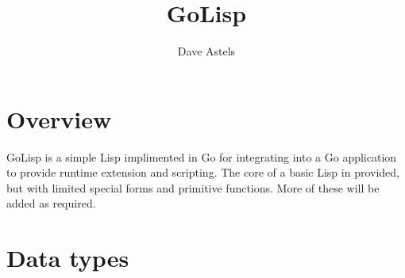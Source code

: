 \documentclass[12pt]{article}
\title{GoLisp}
\author{Dave Astels}
\begin{document}
\maketitle

\section{Overview}

GoLisp is a simple Lisp implimented in Go for integrating into a Go
application to provide runtime extension and scripting. The core of a basic Lisp in provided, but with limited
special forms and primitive functions. More of these will be added as required.

\section{Data types}
\end{document}
